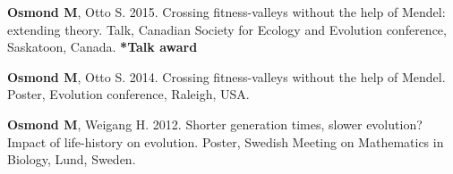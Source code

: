 \documentclass[12pt]{article}
\begin{document}

\textbf{Osmond M}, Otto S. 2015. Crossing fitness-valleys without the help of Mendel: extending theory. Talk, Canadian Society for Ecology and Evolution conference, Saskatoon, Canada. \textbf{*Talk award}


\textbf{Osmond M}, Otto S. 2014. Crossing fitness-valleys without the help of Mendel. Poster, Evolution conference, Raleigh, USA.







\textbf{Osmond M}, Weigang H. 2012. Shorter generation times, slower evolution? Impact of life-history on evolution. Poster, Swedish Meeting on Mathematics in Biology, Lund, Sweden.

\end{document}
